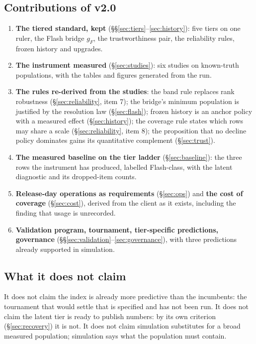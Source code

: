 \subsection{Contributions of v2.0}
\begin{enumerate}[leftmargin=1.6em,itemsep=2pt]
\item \textbf{The tiered standard, kept} (\S\S\ref{sec:tiers}--\ref{sec:history}): five tiers on one ruler, the Flash bridge $g_F$, the trustworthiness pair, the reliability rules, frozen history and upgrades.
\item \textbf{The instrument measured} (\S\ref{sec:studies}): six studies on known-truth populations, with the tables and figures generated from the run.
\item \textbf{The rules re-derived from the studies}: the band rule replaces rank robustness (\S\ref{sec:reliability}, item 7); the bridge's minimum population is justified by the resolution law (\S\ref{sec:flash}); frozen history is an anchor policy with a measured effect (\S\ref{sec:history}); the coverage rule states which rows may share a scale (\S\ref{sec:reliability}, item 8); the proposition that no decline policy dominates gains its quantitative complement (\S\ref{sec:trust}).
\item \textbf{The measured baseline on the tier ladder} (\S\ref{sec:baseline}): the three rows the instrument has produced, labelled Flash-class, with the latent diagnostic and its dropped-item counts.
\item \textbf{Release-day operations as requirements} (\S\ref{sec:ops}) and \textbf{the cost of coverage} (\S\ref{sec:cost}), derived from the client as it exists, including the finding that usage is unrecorded.
\item \textbf{Validation program, tournament, tier-specific predictions, governance} (\S\S\ref{sec:validation}--\ref{sec:governance}), with three predictions already supported in simulation.
\end{enumerate}

\subsection{What it does not claim}
It does not claim the index is already more predictive than the incumbents: the tournament that would settle that is specified and has not been run. It does not claim the latent tier is ready to publish numbers: by its own criterion (\S\ref{sec:recovery}) it is not. It does not claim simulation substitutes for a broad measured population; simulation says what the population must contain.

